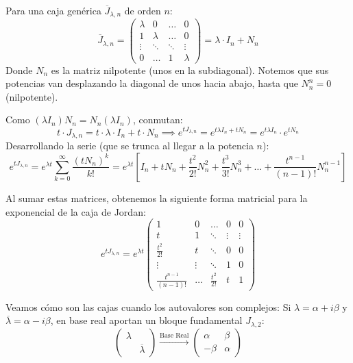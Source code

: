 Para una caja genérica $\overline{J}_{\lambda,n}$ de orden $n$:
\[
    \overline{J}_{\lambda,n} = \begin{pmatrix} 
    \lambda & 0 & \dots & 0 \\ 
    1 & \lambda & \dots & 0 \\
    \vdots & \ddots & \ddots & \vdots \\
    0 & \dots & 1 & \lambda 
    \end{pmatrix} = \lambda \cdot I_n + N_n
\]
Donde $N_n$ es la matriz nilpotente (unos en la subdiagonal). Notemos que sus potencias van desplazando la diagonal de unos hacia abajo, hasta que $N_n^n = 0$ (nilpotente).

Como $(\lambda I_n) N_n = N_n (\lambda I_n)$, conmutan:
\[
    t \cdot J_{\lambda,n} = t \cdot \lambda \cdot I_n + t \cdot N_n \implies e^{t J_{\lambda,n}} = e^{t \lambda I_n + t N_n} = e^{t \lambda I_n} \cdot e^{t N_n}
\]
Desarrollando la serie (que se trunca al llegar a la potencia $n$):
\[
    e^{t J_{\lambda,n}} = e^{\lambda t} \sum_{k=0}^{\infty} \frac{(t N_n)^k}{k!} = e^{\lambda t} \left[ I_n + t N_n + \frac{t^2}{2!} N_n^2 + \frac{t^3}{3!} N_n^3 + \dots + \frac{t^{n-1}}{(n-1)!} N_n^{n-1} \right]
\]

Al sumar estas matrices, obtenemos la siguiente forma matricial para la exponencial de la caja de Jordan:
\[
    e^{t J_{\lambda,n}} = e^{\lambda t} 
    \begin{pmatrix}
        1 & 0 & \dots & 0 & 0 \\
        t & 1 & \ddots & \vdots & \vdots \\
        \frac{t^2}{2!} & t & \ddots & 0 & 0 \\
        \vdots & \vdots & \ddots & 1 & 0 \\
        \frac{t^{n-1}}{(n-1)!} & \dots & \frac{t^2}{2!} & t & 1
    \end{pmatrix}
\]

Veamos cómo son las cajas cuando los autovalores son complejos:
Si $\lambda = \alpha + i\beta$ y $\overline{\lambda} = \alpha - i\beta$, en base real aportan un bloque fundamental $J_{\lambda,2}$:
\[
    \begin{pmatrix} \lambda \\ & \overline{\lambda} \end{pmatrix} \xrightarrow{\text{Base Real}} \begin{pmatrix} \alpha & \beta \\ -\beta & \alpha \end{pmatrix}
\]

